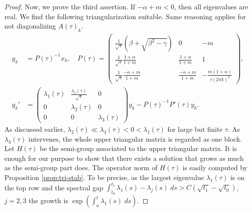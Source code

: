 \documentclass[a4paper,11pt]{article}
\def\k{(2\pi k)}
\theoremstyle{remark}
\begin{document}
\begin{proof}
Now, we prove the third assertion. If $-\alpha+m < 0$, then all eigenvalues are real. We find the following triangularization suitable. Same reasoning applies for not diagonalizing $A(\tau)_k$.
\begin{align}
 y_k &= P(\tau)^{-1} x_k, \quad P(\tau) = \begin{pmatrix} \frac{1}{\sqrt{\tau}}(\beta + \sqrt{\beta^2-\gamma})& 0 & -m\\ \frac{1}{\sqrt{\tau}}\frac{1+\alpha}{1+m} & \frac{1+\alpha}{1+m} & 1\\ \frac{1}{\sqrt{\tau}} \frac{-\alpha+m}{1+m} & \frac{-\alpha+m}{1+m} & -\frac{m(1+\alpha)}{\tau\k^2}\end{pmatrix}, \\
 y_k' &= \begin{pmatrix} \lambda_1(\tau) & \frac{\lambda_1(\tau)}{\sqrt{\tau}} & 0\\0 & \lambda_2(\tau) & 0\\0 & 0 & \lambda_3(\tau)\end{pmatrix} y_k - P(\tau)^{-1}P'(\tau) y_k. \label{eq:block2}
\end{align}
As discussed earlier, $\lambda_2(\tau) \ll \lambda_3(\tau) < 0 < \lambda_1(\tau)$ for large but finite $\tau$. As $\lambda_3(\tau)$ intervenes, the whole upper triangular matrix is regarded as one block. Let $H(\tau)$ be the semi-group associated to the upper triangular matrix. It is enough for our purpose to show that there exists a solution that grows as much as the semi-group part does. The operator norm of $H(\tau)$ is easily computed by Proposition \ref{prop:tri-stab}. To be precise, as the largest eigenvalue $\lambda_1(\tau)$ is on the top row and the spectral gap $\int_{t_0}^{t_1} \lambda_1(s)-\lambda_j(s)\; ds > C (\sqrt{t_1}-\sqrt{t_0})$, $j=2,3$ the growth is $\exp\left( \int_a^t \lambda_1(s)\;ds\right)$.%
\end{proof}
\end{document}
